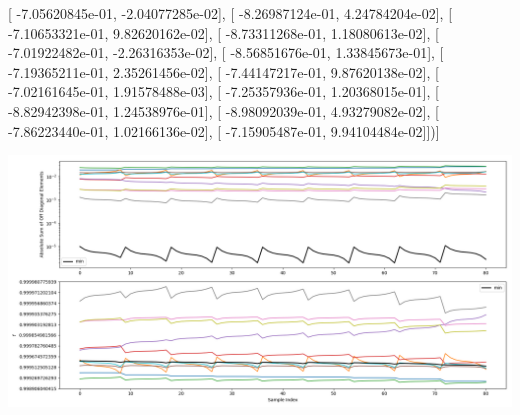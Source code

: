 \documentclass{article}
\begin{document}
       [ -7.05620845e-01,  -2.04077285e-02],
       [ -8.26987124e-01,   4.24784204e-02],
       [ -7.10653321e-01,   9.82620162e-02],
       [ -8.73311268e-01,   1.18080613e-02],
       [ -7.01922482e-01,  -2.26316353e-02],
       [ -8.56851676e-01,   1.33845673e-01],
       [ -7.19365211e-01,   2.35261456e-02],
       [ -7.44147217e-01,   9.87620138e-02],
       [ -7.02161645e-01,   1.91578488e-03],
       [ -7.25357936e-01,   1.20368015e-01],
       [ -8.82942398e-01,   1.24538976e-01],
       [ -8.98092039e-01,   4.93279082e-02],
       [ -7.86223440e-01,   1.02166136e-02],
       [ -7.15905487e-01,   9.94104484e-02]])]
\begin{center}
\includegraphics[scale=.9]{report_pickled_controls162/control_dpn_all.png}

\end{center}
\end{document}
